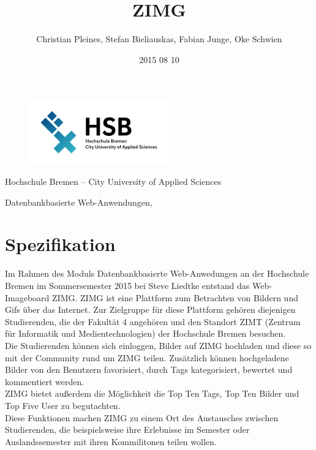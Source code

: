 \documentclass[12pt, oneside, a4paper]{article}		%
\title{ZIMG}
\author{Christian Pleines, Stefan Bieliauskas, Fabian Junge, Oke Schwien}
\date{2015 08 10}
\makeatletter
\renewcommand{\maketitle}{\bgroup\setlength{\parindent}{0pt}
	\begin{center}
		\vspace{4cm}
  		\seqsplit{\Huge{\textbf{\inserttitle}}}

  		\vspace{4cm}
  		\large{\insertauthor}

  		\vspace{2cm}
  		\small{Hochschule Bremen -- City University of Applied Sciences}

  		\small{Datenbankbasierte Web-Anwendungen, \insertdate}
	\end{center}\egroup
}
\let\inserttitle\@title
\let\insertauthor\@author
\let\insertdate\@date
\makeatother
\begin{document}
\begin{figure}[H]
	\centering
 	\includegraphics[width=6cm]{footage/Hochschule_Bremen_Logo_RGB} 
	\label{logoofhochschulebremengermany}
\end{figure}

\maketitle												%
\thispagestyle{empty}									%

\newpage

\tableofcontents

\newpage

\section{Spezifikation}

Im Rahmen des Moduls Datenbankbasierte Web-Anwedungen an der Hochschule Bremen im Sommersemester 2015 bei Steve Liedtke entstand das Web-Imageboard ZIMG. ZIMG ist eine Plattform zum Betrachten von Bildern und Gifs über das Internet. Zur Zielgruppe für diese Plattform gehören diejenigen Studierenden, die der Fakultät 4 angehören und den Standort ZIMT (Zentrum für Informatik und Medientechnologien) der Hochschule Bremen besuchen. \\
Die Studierenden können sich einloggen, Bilder auf ZIMG hochladen und diese so mit der Community rund um ZIMG teilen. Zusätzlich können hochgeladene Bilder von den Benutzern favorisiert, durch Tags kategorisiert, bewertet und kommentiert werden. \\
ZIMG bietet außerdem die Möglichkeit die Top Ten Tags, Top Ten Bilder und Top Five User zu begutachten. \\
Diese Funktionen machen ZIMG zu einem Ort des Austausches zwischen Studierenden, die beispielsweise ihre Erlebnisse im Semester oder Auslandssemester mit ihren Kommilitonen teilen wollen.
\end{document}

